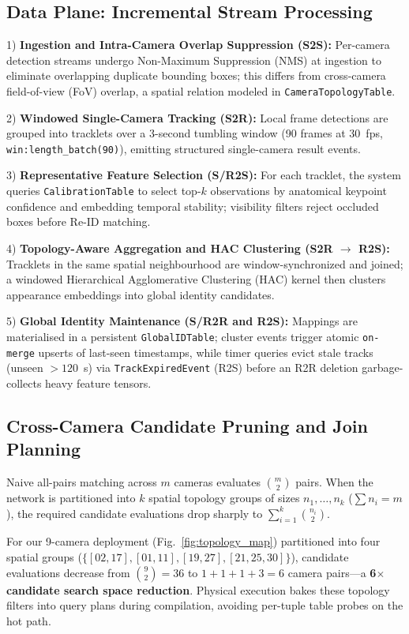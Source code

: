 \documentclass[conference]{IEEEtran}
\begin{document}
\subsection{Data Plane: Incremental Stream Processing}
1) \textbf{Ingestion and Intra-Camera Overlap Suppression (S2S):} Per-camera detection streams undergo Non-Maximum Suppression (NMS) at ingestion to eliminate overlapping duplicate bounding boxes; this differs from cross-camera field-of-view (FoV) overlap, a spatial relation modeled in \texttt{CameraTopologyTable}.

2) \textbf{Windowed Single-Camera Tracking (S2R):} Local frame detections are grouped into tracklets over a 3-second tumbling window (90 frames at 30~fps, \texttt{win:length\_batch(90)}), emitting structured single-camera result events.

3) \textbf{Representative Feature Selection (S/R2S):} For each tracklet, the system queries \texttt{CalibrationTable} to select top-$k$ observations by anatomical keypoint confidence and embedding temporal stability; visibility filters reject occluded boxes before Re-ID matching.

4) \textbf{Topology-Aware Aggregation and HAC Clustering (S2R $\to$ R2S):} Tracklets in the same spatial neighbourhood are window-synchronized and joined; a windowed Hierarchical Agglomerative Clustering (HAC) kernel then clusters appearance embeddings into global identity candidates.

5) \textbf{Global Identity Maintenance (S/R2R and R2S):} Mappings are materialised in a persistent \texttt{GlobalIDTable}; cluster events trigger atomic \texttt{on-merge} upserts of last-seen timestamps, while timer queries evict stale tracks (unseen $>120$~s) via \texttt{TrackExpiredEvent} (R2S) before an R2R deletion garbage-collects heavy feature tensors.

\subsection{Cross-Camera Candidate Pruning and Join Planning}
Naive all-pairs matching across $m$ cameras evaluates $\binom{m}{2}$ pairs. When the network is partitioned into $k$ spatial topology groups of sizes $n_1, \dots, n_k$ ($\sum n_i = m$), the required candidate evaluations drop sharply to $\sum_{i=1}^{k} \binom{n_i}{2}$.

For our 9-camera deployment (Fig.~\ref{fig:topology_map}) partitioned into four spatial groups ($\{[02,17], [01,11], [19,27], [21,25,30]\}$), candidate evaluations decrease from $\binom{9}{2} = 36$ to $1+1+1+3 = 6$ camera pairs---a \textbf{6$\times$ candidate search space reduction}. Physical execution bakes these topology filters into query plans during compilation, avoiding per-tuple table probes on the hot path.
\end{document}
